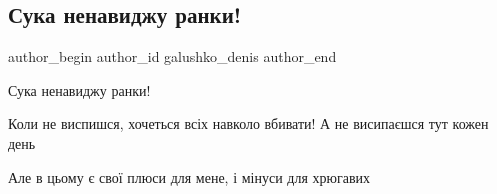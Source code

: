  
 
 
 
 

\subsection{Сука ненавиджу ранки!}
\label{sec:29_09_2022.fb.galushko_denis.1.suka_nenavidzhu_rank}

\ifcmt
 author_begin
   author_id galushko_denis
 author_end
\fi

Сука ненавиджу ранки!

Коли не виспишся, хочеться всіх навколо вбивати! А не висипаєшся тут кожен день

Але в цьому є свої плюси для мене, і мінуси для хрюгавих
